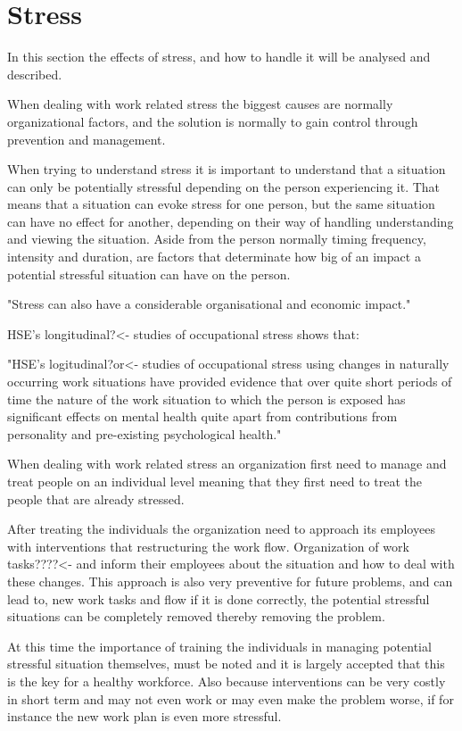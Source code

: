 \section{Stress}
In this section the effects of stress, and how to handle it will be analysed and described.

When dealing with work related stress the biggest causes are normally organizational factors, and the solution is normally to gain control through prevention and management.

When trying to understand stress it is important to understand that a situation can only be potentially stressful depending on the person experiencing it. That means that a situation can evoke stress for one person, but the same situation can have no effect for another, depending on their way of handling understanding and viewing the situation. Aside from the person normally timing frequency, intensity and duration, are factors that determinate how big of an impact a potential stressful situation can have on the person.

"Stress can also have a considerable organisational and economic impact."

HSE's longitudinal?<- studies of occupational stress shows that:

"HSE's logitudinal?or<- studies of occupational stress using changes in naturally occurring work situations have provided evidence that over quite short periods of time the nature of the work situation to which the person is exposed has significant effects on mental health quite apart from contributions from personality and pre-existing psychological health."

When dealing with work related stress an organization first need to manage and treat people on an individual level meaning that they first need to treat the people that are already stressed\cite{control_stress_work}.

After treating the individuals the organization need to approach its employees with interventions that restructuring the work flow. Organization of work tasks????<- and inform their employees about the situation and how to deal with these changes. This approach is also very preventive for future problems, and can lead to, new work tasks and flow if it is done correctly, the potential stressful situations can be completely removed thereby removing the problem.

At this time the importance of training the individuals in managing potential stressful situation themselves, must be noted and it is largely accepted that this is the key for a healthy workforce. Also because interventions can be very costly in short term and may not even work or may even make the problem worse, if for instance the new work plan is even more stressful.

